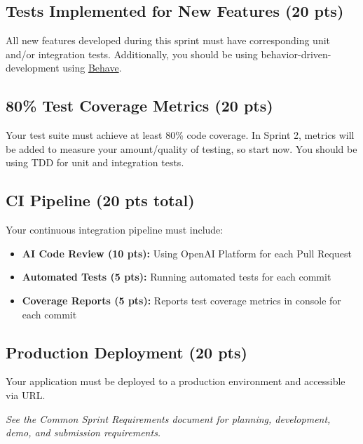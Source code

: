 \documentclass[11pt]{article}
\begin{document}
\subsection{Tests Implemented for New Features (20 pts)}
All new features developed during this sprint must have corresponding unit and/or integration tests. Additionally, you should be using behavior-driven-development using \href{https://behave-django.readthedocs.io/en/stable/index.html}{Behave}.

\subsection{80\% Test Coverage Metrics (20 pts)}
Your test suite must achieve at least 80\% code coverage. In Sprint 2, metrics will be added to measure your amount/quality of testing, so start now. You should be using TDD for unit and integration tests.

\subsection{CI Pipeline (20 pts total)}
Your continuous integration pipeline must include:
\begin{itemize}
    \item \textbf{AI Code Review (10 pts):} Using OpenAI Platform for each Pull Request
    \item \textbf{Automated Tests (5 pts):} Running automated tests for each commit
    \item \textbf{Coverage Reports (5 pts):} Reports test coverage metrics in console for each commit
\end{itemize}

\subsection{Production Deployment (20 pts)}
Your application must be deployed to a production environment and accessible via URL.

\vspace{2em}
\noindent\textit{See the Common Sprint Requirements document for planning, development, demo, and submission requirements.}
\end{document}
